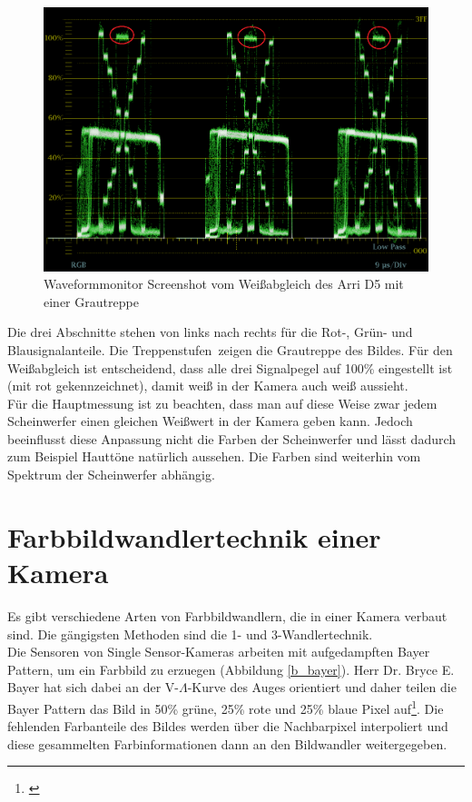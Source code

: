 \begin{figure}[H]     %
\centering
\includegraphics[width=1.0\textwidth]{bilder/arri} 
\caption {Waveformmonitor Screenshot vom Weißabgleich des Arri D5 mit einer Grautreppe}\label{b_matrix}
\end{figure}


Die drei Abschnitte stehen von links nach rechts für die Rot-, Grün- und Blausignalanteile. Die \glqq Treppenstufen\grqq\ zeigen die Grautreppe des Bildes. Für den Weißabgleich ist entscheidend, dass alle drei Signalpegel auf 100\% eingestellt ist (mit rot gekennzeichnet), damit weiß in der Kamera auch weiß aussieht. \\
Für die Hauptmessung ist zu beachten, dass man auf diese Weise zwar jedem Scheinwerfer einen gleichen Weißwert in der Kamera geben kann. Jedoch beeinflusst diese Anpassung nicht die Farben der Scheinwerfer und lässt dadurch zum Beispiel Hauttöne natürlich aussehen. Die Farben sind weiterhin vom Spektrum der Scheinwerfer abhängig.

\section{Farbbildwandlertechnik einer Kamera}
\label{sec_wandler}
Es gibt verschiedene Arten von Farbbildwandlern, die in einer Kamera verbaut sind. Die gängigsten Methoden sind die 1- und 3-Wandlertechnik.\\
Die Sensoren von \glqq Single Sensor\grqq -Kameras arbeiten mit aufgedampften Bayer Pattern, um ein Farbbild zu erzuegen (Abbildung \ref{b_bayer}). Herr Dr. Bryce E. Bayer hat sich dabei an der V-$\Lambda$-Kurve des Auges orientiert und daher teilen die Bayer Pattern das Bild in 50\% grüne, 25\% rote und 25\% blaue Pixel auf\footnote{\cite{itwissen}}. Die fehlenden Farbanteile des Bildes werden über die Nachbarpixel interpoliert und diese gesammelten Farbinformationen dann an den Bildwandler weitergegeben.

